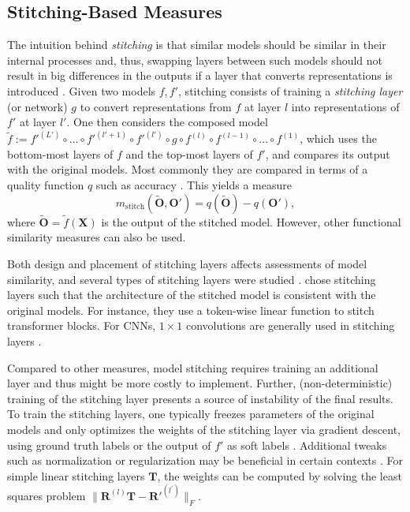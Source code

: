\documentclass{article}
\newcommand{\citet}{\textcite}
\newcommand{\R}{\bm{R}}
\newcommand{\Out}{\bm{O}}
\newcommand{\Outp}{\bm{O'}}
\begin{document}
\subsection{Stitching-Based Measures} \label{subsec:stitching}

The intuition behind \emph{stitching} is that similar models should be similar in their internal processes and, thus, swapping layers between such models should not result in big differences in the outputs if a layer that converts representations is introduced \cite{lenc_understanding_2015, csiszarik_similarity_2021, bansal_revisiting_2021}.
Given two models $f, f'$, stitching consists of training a \emph{stitching layer} (or network) $g$ to convert representations from $f$ at layer $l$ into representations of $f'$ at layer $l'$.
One then considers the composed model
$\widetilde{f} := f'^{(L')} \circ \dots \circ f'^{(l'+1)} \circ f'^{(l')} \circ g \circ f^{(l)} \circ f^{(l-1)} \circ \dots \circ f^{(1)}$,
which uses the bottom-most layers of $f$ and the top-most layers of $f'$, and compares its output with the original models.
Most commonly they are compared in terms of a quality function $q$ such as accuracy \cite{csiszarik_similarity_2021, bansal_revisiting_2021}.
This yields a measure
\begin{equation}
    m_{\text{stitch}}(\widetilde{\Out}, \Outp) = q(\widetilde{\Out}) - q(\Outp),
\end{equation}
where $\widetilde{\Out}=\widetilde{f}(\bm{X})$ is the output of the stitched model.
However, other functional similarity measures can also be used.

Both design and placement of stitching layers affects assessments of model similarity, and several types of stitching layers were studied \cite{csiszarik_similarity_2021, godfrey_symmetries_2022}.
\citet{bansal_revisiting_2021} chose stitching layers such that the architecture of the stitched model is consistent with the original models.
For instance, they use a token-wise linear function to stitch transformer blocks.
For CNNs, $1\times 1$ convolutions are generally used in stitching layers \cite{lenc_understanding_2015, csiszarik_similarity_2021, bansal_revisiting_2021}.

Compared to other measures, model stitching requires training an additional layer and thus might be more costly to implement.
Further, (non-deterministic) training of the stitching layer presents a source of instability of the final results.
To train the stitching layers, one typically freezes parameters of the original models and only optimizes the weights of the stitching layer via gradient descent, using ground truth labels or the output of $f'$ as soft labels \cite{csiszarik_similarity_2021, bansal_revisiting_2021, lenc_understanding_2015}.
Additional tweaks such as normalization or regularization may be beneficial in certain contexts \cite{bansal_revisiting_2021, csiszarik_similarity_2021}.
For simple linear stitching layers $\bm{T}$, the weights can be computed by solving the least squares problem $\|\R^{(l)}\bm{T}-\bm{R'}^{(l^\prime)}\|_F$.
\end{document}
